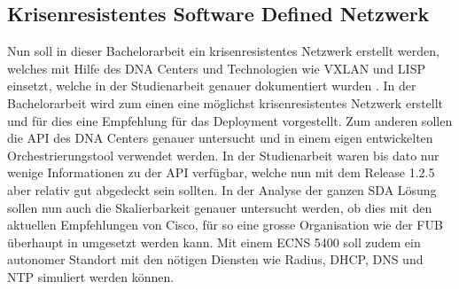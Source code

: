 \subsection{Krisenresistentes Software Defined Netzwerk}
Nun soll in dieser Bachelorarbeit ein krisenresistentes Netzwerk erstellt werden, welches mit Hilfe des DNA Centers und Technologien wie VXLAN und LISP einsetzt, welche in der Studienarbeit genauer dokumentiert wurden \cite{studienarbeit}. In der Bachelorarbeit wird zum einen eine möglichst krisenresistentes Netzwerk erstellt und für dies eine Empfehlung für das Deployment vorgestellt. Zum anderen sollen die API des DNA Centers genauer untersucht und in einem eigen entwickelten Orchestrierungstool verwendet werden. In der Studienarbeit waren bis dato nur wenige Informationen zu der API verfügbar, welche nun mit dem Release 1.2.5 aber relativ gut abgedeckt sein sollten. In der Analyse der ganzen SDA Lösung sollen nun auch die Skalierbarkeit genauer untersucht werden, ob dies mit den aktuellen Empfehlungen von Cisco, für so eine grosse Organisation wie der FUB überhaupt in umgesetzt werden kann. Mit einem ECNS 5400 soll zudem ein autonomer Standort mit den nötigen Diensten wie Radius, DHCP, DNS und NTP simuliert werden können.





